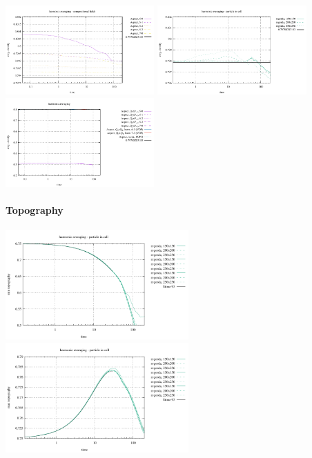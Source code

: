 \begin{center}
\includegraphics[width=5.7cm]{images/stokes_sphere_fs2D/avrg_density_harm_comp}
\includegraphics[width=5.7cm]{images/stokes_sphere_fs2D/avrg_density_harm_pic}
\includegraphics[width=5.7cm]{images/stokes_sphere_fs2D/avrg_density_harm_add}\\
\end{center}

\paragraph{Topography}
\begin{center}
\includegraphics[width=7cm]{images/stokes_sphere_fs2D/topography_min}
\includegraphics[width=7cm]{images/stokes_sphere_fs2D/topography_max}
\end{center}

